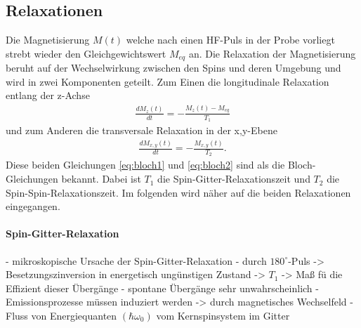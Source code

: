 \subsection{Relaxationen}
Die Magnetisierung $M(t)$ welche nach einen HF-Puls in der Probe vorliegt strebt wieder den Gleichgewichtswert $M_{eq}$ an.
Die Relaxation der Magnetisierung beruht auf der Wechselwirkung zwischen den Spins und deren Umgebung und wird in zwei Komponenten geteilt.
Zum Einen die longitudinale Relaxation entlang der z-Achse
\begin{align}
	\frac{d M_z(t)}{d t} = - \frac{M_z(t) - M_{eq}}{T_1} 
	\label{eq:bloch1}
\end{align}
und zum Anderen die transversale Relaxation in der x,y-Ebene
\begin{align}
	\frac{d M_{x,y}(t)}{d t} = - \frac{M_{x,y}(t)}{T_2}. 
	\label{eq:bloch2}
\end{align}
Diese beiden Gleichungen \eqref{eq:bloch1} und \eqref{eq:bloch2} sind als die Bloch-Gleichungen bekannt.
Dabei ist $T_1$ die Spin-Gitter-Relaxationszeit und $T_2$ die Spin-Spin-Relaxationszeit.
Im folgenden wird n\"{a}her auf die beiden Relaxationen eingegangen.

\paragraph{Spin-Gitter-Relaxation}
- mikroskopische Ursache der Spin-Gitter-Relaxation
- durch $180^{\circ}$-Puls -> Besetzungszinversion in energetisch ung\"{u}nstigen Zustand
-> $T_1$ -> Ma{\ss} f\"{u} die Effizient dieser \"{U}berg\"{a}nge
- spontane \"{U}berg\"{a}nge sehr unwahrscheinlich
- Emissionsprozesse m\"{u}ssen induziert werden -> durch magnetisches Wechselfeld
- Fluss von Energiequanten $(\hbar \omega_0)$ vom Kernspinsystem im Gitter

